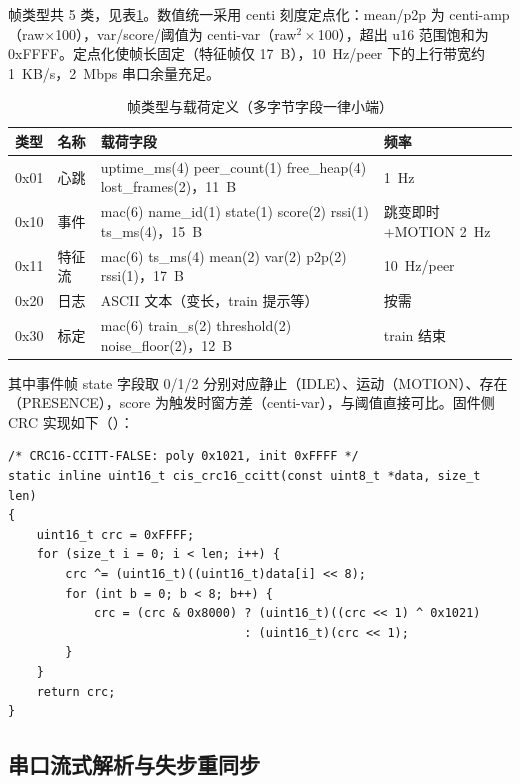 帧类型共 5 类，见表\ref{tab:payload}。数值统一采用 centi 刻度定点化：mean/p2p 为 centi-amp（raw$\times$100），var/score/阈值为 centi-var（raw$^2\times$100），超出 u16 范围饱和为 0xFFFF。定点化使帧长固定（特征帧仅 17~B），10~Hz/peer 下的上行带宽约 1~KB/s，2~Mbps 串口余量充足。

\begin{table}[htbp]
  \centering
  \caption{帧类型与载荷定义（多字节字段一律小端）}
  \label{tab:payload}
  \begin{tabular}{llp{6.6cm}l}
    \toprule
    \textbf{类型} & \textbf{名称} & \textbf{载荷字段} & \textbf{频率} \\
    \midrule
    0x01 & 心跳 & uptime\_ms(4) peer\_count(1) free\_heap(4) lost\_frames(2)，11~B & 1~Hz \\
    0x10 & 事件 & mac(6) name\_id(1) state(1) score(2) rssi(1) ts\_ms(4)，15~B & 跳变即时+MOTION 2~Hz \\
    0x11 & 特征流 & mac(6) ts\_ms(4) mean(2) var(2) p2p(2) rssi(1)，17~B & 10~Hz/peer \\
    0x20 & 日志 & ASCII 文本（变长，train 提示等） & 按需 \\
    0x30 & 标定 & mac(6) train\_s(2) threshold(2) noise\_floor(2)，12~B & train 结束 \\
    \bottomrule
  \end{tabular}
\end{table}

其中事件帧 state 字段取 0/1/2 分别对应静止（IDLE）、运动（MOTION）、存在（PRESENCE），score 为触发时窗方差（centi-var），与阈值直接可比。固件侧 CRC 实现如下（）：

\begin{lstlisting}[style=cstyle, caption={CRC-16/CCITT-FALSE 固件实现（cis\_protocol.h）}]
/* CRC16-CCITT-FALSE: poly 0x1021, init 0xFFFF */
static inline uint16_t cis_crc16_ccitt(const uint8_t *data, size_t len)
{
    uint16_t crc = 0xFFFF;
    for (size_t i = 0; i < len; i++) {
        crc ^= (uint16_t)((uint16_t)data[i] << 8);
        for (int b = 0; b < 8; b++) {
            crc = (crc & 0x8000) ? (uint16_t)((crc << 1) ^ 0x1021)
                                 : (uint16_t)(crc << 1);
        }
    }
    return crc;
}
\end{lstlisting}

\subsection{串口流式解析与失步重同步}

